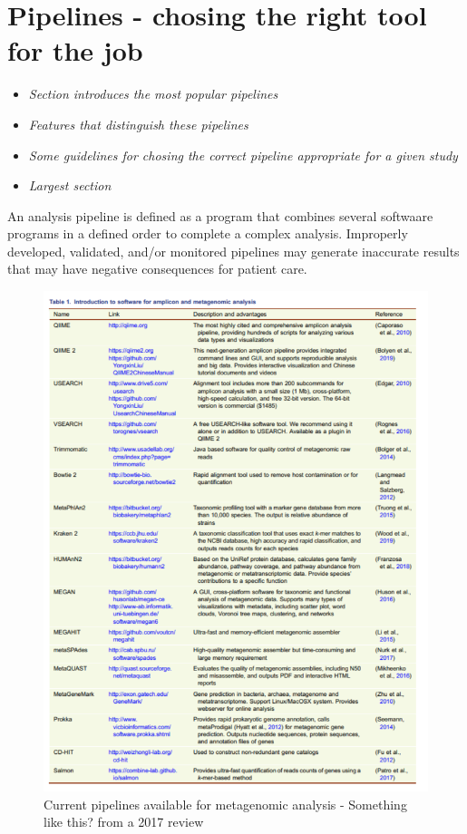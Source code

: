 \documentclass{article}
\begin{document}
\section{Pipelines - chosing the right tool for the job}
\begin{itemize}
	\item \emph{Section introduces the most popular pipelines}
	\item \emph{Features that distinguish these pipelines}
	\item \emph{Some guidelines for chosing the correct pipeline appropriate for a given study}
	\item \emph{Largest section}
\end{itemize}
An analysis pipeline is defined as a program that combines several softwaare programs in a defined order to complete a complex analysis.
Improperly developed, validated, and/or monitored pipelines may generate inaccurate results that may have negative consequences for patient care.
\begin{figure}
\centering
\includegraphics[scale=0.7]{figures/table.png}
\caption[Current pipelines available for metagenomic analysis]{
	Current pipelines available for metagenomic analysis - Something like this? from a 2017 review}
\label{Fpipelines}
\end{figure}
\end{document}
